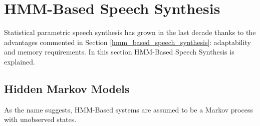 \section{HMM-Based Speech Synthesis}
\label{hmm_synthesis}
Statistical parametric speech synthesis has grown in the last decade thanks to the advantages commented in Section \ref{hmm_based_speech_synthesis}: adaptability and memory requirements. In this section HMM-Based Speech Synthesis is explained.

\subsection{Hidden Markov Models}
\label{hmm_syntheis_markov}
As the name suggests, HMM-Based systems are assumed to be a Markov process with unobserved states. 